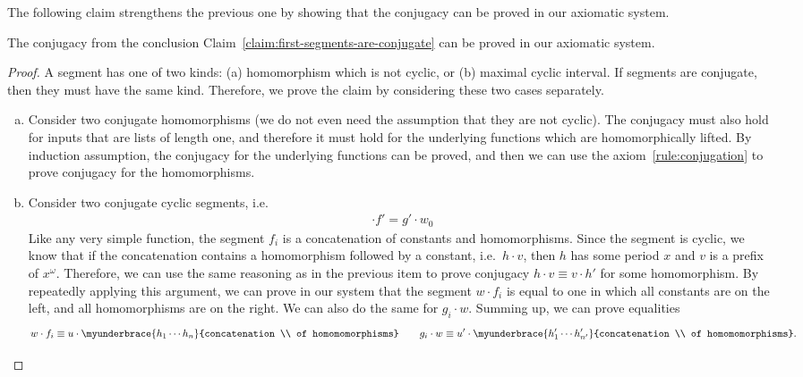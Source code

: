 The following claim strengthens the previous one by showing that the conjugacy can be proved in our axiomatic system.
\begin{claim}
    The conjugacy from the conclusion Claim~\ref{claim:first-segments-are-conjugate} can be proved in our axiomatic system.
\end{claim}
 \begin{proof}
    A segment has one of two kinds: (a) homomorphism which is not cyclic, or (b)  maximal cyclic interval. If segments are conjugate, then they must have the same kind. Therefore, we prove the claim by considering these two cases separately.
     
    \begin{enumerate}[(a)]
        \item Consider two conjugate homomorphisms (we do not even need the assumption that they are not cyclic). The conjugacy must also hold for inputs that are lists of length one, and therefore it must hold for the underlying functions which are homomorphically lifted. By induction assumption, the conjugacy for the underlying functions can be proved, and then we can use the axiom~\eqref{rule:conjugation} to prove conjugacy for the homomorphisms.
        \item Consider two conjugate cyclic segments, i.e.~
            \begin{align*}
             \cdot f' = g' \cdot w_0
            \end{align*}
    Like any very simple function, the segment $f_i$ is a concatenation of constants and homomorphisms. Since the segment is cyclic, we know that if the concatenation contains a  homomorphism followed by a constant, i.e.~$h \cdot v$,  then $h$ has some period $x$ and $v$ is a prefix of $x^\omega$. Therefore, we can use the same reasoning as in the previous item  to prove conjugacy $h \cdot v \equiv v \cdot h'$ for some homomorphism. By repeatedly applying this argument, we can prove in our system that the segment $w \cdot f_i$ is equal to one in which all constants are on the left, and all homomorphisms are on the right. We can also do the same for $g_i \cdot w$. Summing up, we can prove equalities
    \begin{align*}
    w \cdot f_i \equiv u \cdot \myunderbrace{h_1 \cdots h_n}{concatenation \\ of homomomorphisms} \qquad g_i \cdot w \equiv u' \cdot \myunderbrace{h'_1 \cdots h'_{n'}}{concatenation \\ of homomomorphisms}.
    \end{align*}

\end{enumerate}
\end{proof}
